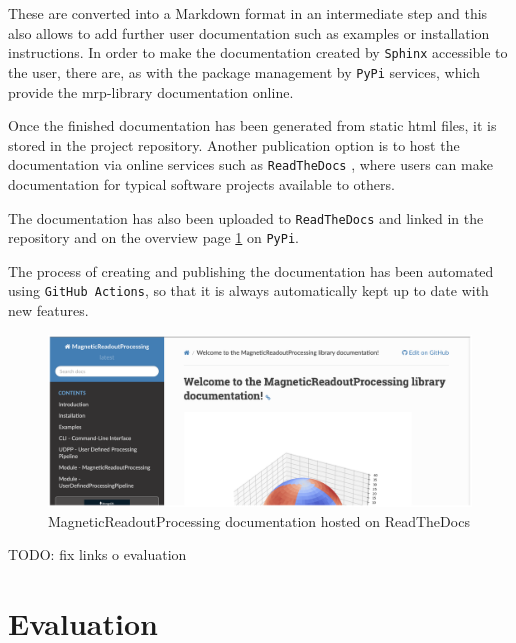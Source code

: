 These are converted into a Markdown format in an intermediate step and
this also allows to add further user documentation such as examples or
installation instructions. In order to make the documentation created by
\passthrough{\lstinline!Sphinx!} accessible to the user, there are, as
with the package management by \passthrough{\lstinline!PyPi!} services,
which provide the \gls{mrp}-library documentation online.

Once the finished documentation has been generated from static
\gls{html} files, it is stored in the project repository. Another
publication option is to host the documentation via online services such
as \passthrough{\lstinline!ReadTheDocs!} \cite{ReadTheDocs}, where
users can make documentation for typical software projects available to
others.

The documentation has also been uploaded to
\passthrough{\lstinline!ReadTheDocs!}
\cite{MagneticReadoutProcessingReadTheDocs} and linked in the
repository and on the overview page
\ref{MagneticReadoutProcessing_documentation_hosted_on_ReadTheDocs.png}
on \passthrough{\lstinline!PyPi!}.

The process of creating and publishing the documentation has been
automated using \passthrough{\lstinline!GitHub Actions!}, so that it is
always automatically kept up to date with new features.

\begin{figure}
\centering
\includegraphics{./generated_images/border_MagneticReadoutProcessing_documentation_hosted_on_ReadTheDocs.png}
\caption{MagneticReadoutProcessing documentation hosted on ReadTheDocs
\label{MagneticReadoutProcessing_documentation_hosted_on_ReadTheDocs.png}}
\end{figure}

TODO: fix links o evaluation

\hypertarget{evaluation}{%
\chapter{Evaluation}\label{evaluation}}

